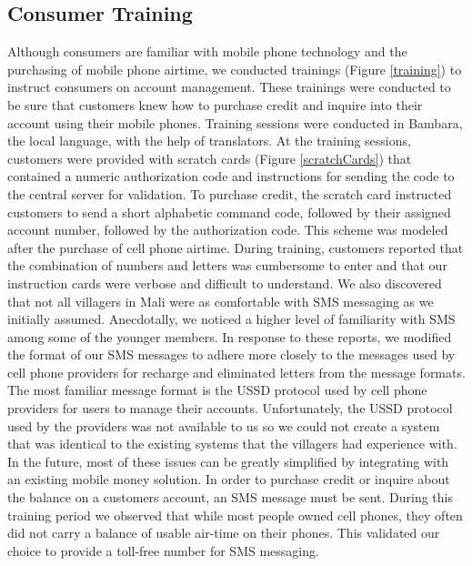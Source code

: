\documentclass{sig-alternate}
\begin{document}
\subsection{Consumer Training}
Although consumers are familiar with mobile phone technology and the
purchasing of mobile phone airtime, we conducted trainings (Figure \ref{training})
to instruct consumers on account management.
These trainings were conducted to be sure that customers knew how to
purchase credit and inquire into their account using their mobile
phones.
Training sessions were conducted in Bambara, the local language, with
the help of translators.
At the training sessions, customers were provided with scratch cards (Figure
\ref{scratchCards}) that contained a numeric authorization code and
instructions for sending the code to the central server for
validation.
To purchase credit, the scratch card instructed customers to send a
short alphabetic command code, followed by their assigned account
number, followed by the authorization code.
This scheme was modeled after the purchase of cell phone airtime.
During training, customers reported that the combination of numbers and letters was
cumbersome to enter and that our instruction cards were verbose and
difficult to understand.
We also discovered that not all villagers in Mali were as
comfortable with SMS messaging as we initially assumed.
Anecdotally, we noticed a higher level of familiarity with SMS
among some of the younger members.
In response to these reports, we modified the format of our SMS messages
to adhere more closely to the messages used by cell phone providers for
recharge and eliminated letters from the message formats.
The most familiar message format is the USSD protocol used by
cell phone providers for users to manage their accounts.
Unfortunately, the USSD protocol used by the providers was not available
to us so we could not create a system that was identical to the existing
systems that the villagers had experience with.
In the future, most of these issues can be greatly simplified by integrating
with an existing mobile money solution.
In order to purchase credit or inquire about the balance on a customers
account, an SMS message must be sent.
During this training period we observed that while most people owned
cell phones, they often did not carry a balance of usable air-time on
their phones.
This validated our choice to provide a toll-free number for SMS messaging.
\end{document}
